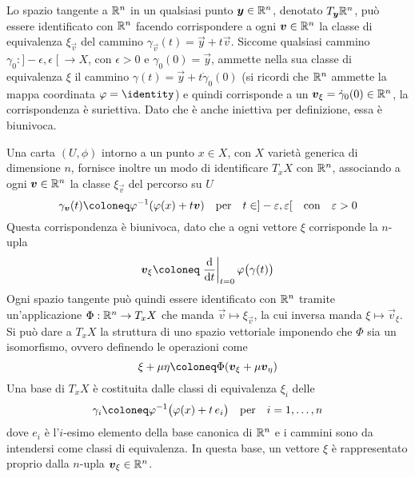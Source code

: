 Lo spazio tangente a $\mathbb{R}^{n}$ in un qualsiasi punto $\boldsymbol{y} \in \mathbb{R}^{n}$, denotato $T_{\boldsymbol{y}} \mathbb{R}^{n}$, può essere identificato con $\mathbb{R}^{n}$ facendo corrispondere a ogni $\boldsymbol{v} \in \mathbb{R}^{n}$ la classe di equivalenza $\xi_{\vec{v}}$ del cammino $\gamma_{\vec{v}}(t) = \vec{y} + t\vec{v}$. Siccome qualsiasi cammino $\gamma_0:]-\epsilon,\epsilon\;[\ \to X$, con $\epsilon > 0$ e $\gamma_0(0)=\vec{y}$, ammette nella sua classe di equivalenza $\xi$ il cammino $\gamma(t) = \vec{y} + t\dot{\gamma}_0(0)$ (si ricordi che $\mathbb{R}^{n}$ ammette la mappa coordinata $\phi = \identity$) e quindi corrisponde a un $\boldsymbol{v}_{\xi} = \dot{\gamma}_0(0) \in \mathbb{R}^{n}$, la corrispondenza è suriettiva. Dato che è anche iniettiva per definizione, essa è biunivoca. 

Una carta $(U, \phi)$ intorno a un punto $x \in  X$, con $X$ varietà generica di dimensione $n$, fornisce inoltre un modo di identificare $T_x X$ con $\mathbb{R}^{n}$, associando a ogni $\boldsymbol{v} \in \mathbb{R}^{n}$ la classe $\xi_{\vec{v}}$ del percorso su $U$ \begin{equation} \label{eq:tangentRn}
  \gamma_{\vec{v}}(t) \defeq \phi^{-1}(\phi(x)+t\vec{v}) \qqtext{per} t \in ]-\epsilon, \epsilon[ \qqtext{con} \epsilon > 0
\end{equation} Questa corrispondenza è biunivoca, dato che a ogni vettore $\xi$ corrisponde la $n$-upla \begin{equation} \label{eq:tangentCoords}
\vec{v}_{\xi} \defeq \eval{\dv{t}}_{t=0} \phi\big( \gamma(t)\big)
\end{equation} Ogni spazio tangente può quindi essere identificato con $\mathbb{R}^{n}$ tramite un'applicazione $\Phi: \mathbb{R}^{n} \to T_x X$ che manda $\vec{v} \mapsto \xi_{\vec{v}}$, la cui inversa manda $\xi \mapsto \vec{v}_{\xi}$. Si può dare a $T_x X$ la struttura di uno spazio vettoriale imponendo che $\Phi$ sia un isomorfismo, ovvero definendo le operazioni come
\begin{equation}
\xi + \mu \eta \defeq \Phi(\vec{v}_\xi + \mu \vec{v}_{\eta})
\end{equation}
Una base di $T_x X$ è costituita dalle classi di equivalenza $\xi_i$ delle  \begin{equation} \label{eq:tangentRnBase}
  \gamma_i \defeq \phi^{-1}\big(\phi(x)+t\, e_i\big) \qqtext{per} i=1, \ldots, n
\end{equation}
dove $e_i$ è l'$i$-esimo elemento della base canonica di $\mathbb{R}^{n}$ e i cammini sono da intendersi come classi di equivalenza. In questa base, un vettore $\xi$ è rappresentato proprio dalla $n$-upla $\boldsymbol{v}_{\xi} \in \mathbb{R}^{n}$.

